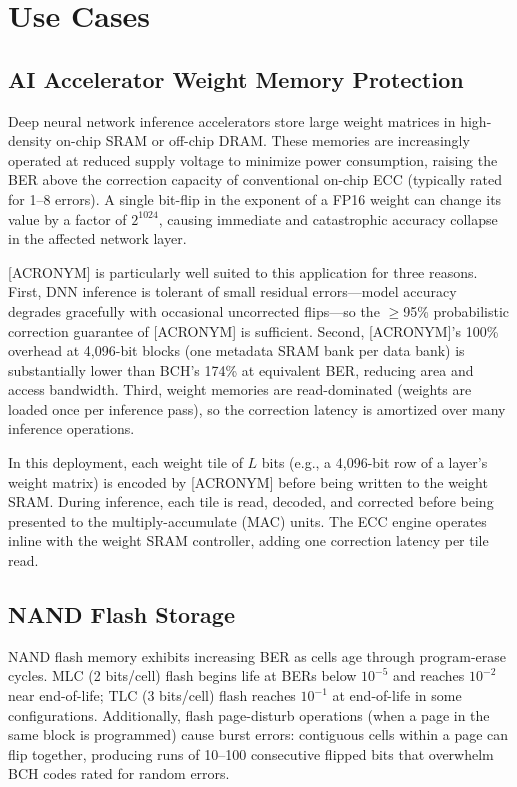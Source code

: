 \chapter*{Use Cases} \label{use_cases}

\section{AI Accelerator Weight Memory Protection}

Deep neural network inference accelerators store large weight matrices in high-density on-chip SRAM or off-chip DRAM. These memories are increasingly operated at reduced supply voltage to minimize power consumption, raising the BER above the correction capacity of conventional on-chip ECC (typically rated for 1--8 errors). A single bit-flip in the exponent of a FP16 weight can change its value by a factor of $2^{1024}$, causing immediate and catastrophic accuracy collapse in the affected network layer.

[ACRONYM] is particularly well suited to this application for three reasons. First, DNN inference is tolerant of small residual errors---model accuracy degrades gracefully with occasional uncorrected flips---so the $\geq$95\% probabilistic correction guarantee of [ACRONYM] is sufficient. Second, [ACRONYM]'s 100\% overhead at 4,096-bit blocks (one metadata SRAM bank per data bank) is substantially lower than BCH's 174\% at equivalent BER, reducing area and access bandwidth. Third, weight memories are read-dominated (weights are loaded once per inference pass), so the correction latency is amortized over many inference operations.

In this deployment, each weight tile of $L$ bits (e.g., a 4,096-bit row of a layer's weight matrix) is encoded by [ACRONYM] before being written to the weight SRAM. During inference, each tile is read, decoded, and corrected before being presented to the multiply-accumulate (MAC) units. The ECC engine operates inline with the weight SRAM controller, adding one correction latency per tile read.

\section{NAND Flash Storage}

NAND flash memory exhibits increasing BER as cells age through program-erase cycles. MLC (2 bits/cell) flash begins life at BERs below $10^{-5}$ and reaches $10^{-2}$ near end-of-life; TLC (3 bits/cell) flash reaches $10^{-1}$ at end-of-life in some configurations. Additionally, flash page-disturb operations (when a page in the same block is programmed) cause burst errors: contiguous cells within a page can flip together, producing runs of 10--100 consecutive flipped bits that overwhelm BCH codes rated for random errors.

